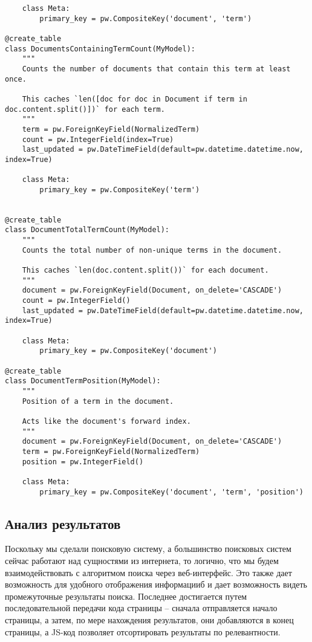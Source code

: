 \documentclass[a4page]{article}
\let\Oldsubsection\subsection
\renewcommand{\subsection}{\FloatBarrier\Oldsubsection}
\begin{document}
\begin{verbatim}
    class Meta:
        primary_key = pw.CompositeKey('document', 'term')

@create_table
class DocumentsContainingTermCount(MyModel):
    """
    Counts the number of documents that contain this term at least once.
    
    This caches `len([doc for doc in Document if term in doc.content.split()])` for each term.
    """
    term = pw.ForeignKeyField(NormalizedTerm)
    count = pw.IntegerField(index=True)
    last_updated = pw.DateTimeField(default=pw.datetime.datetime.now, index=True)

    class Meta:
        primary_key = pw.CompositeKey('term')


@create_table
class DocumentTotalTermCount(MyModel):
    """
    Counts the total number of non-unique terms in the document.

    This caches `len(doc.content.split())` for each document.
    """
    document = pw.ForeignKeyField(Document, on_delete='CASCADE')
    count = pw.IntegerField()
    last_updated = pw.DateTimeField(default=pw.datetime.datetime.now, index=True)

    class Meta:
        primary_key = pw.CompositeKey('document')

@create_table
class DocumentTermPosition(MyModel):
    """
    Position of a term in the document.

    Acts like the document's forward index.
    """
    document = pw.ForeignKeyField(Document, on_delete='CASCADE')
    term = pw.ForeignKeyField(NormalizedTerm)
    position = pw.IntegerField()

    class Meta:
        primary_key = pw.CompositeKey('document', 'term', 'position')
\end{verbatim}

\subsection{Анализ результатов}

Поскольку мы сделали поисковую систему, а большинство поисковых систем сейчас работают над сущностями из интернета, то логично, что мы будем взаимодействовать с алгоритмом поиска через веб-интерфейс. Это также дает возможность для удобного отображения информацииб и дает возможность видеть промежуточные результаты поиска. Последнее достигается путем последовательной передачи кода страницы -- сначала отправляется начало страницы, а затем, по мере нахождения результатов, они добавляются в конец страницы, а JS-код позволяет отсортировать результаты по релевантности.
\end{document}
